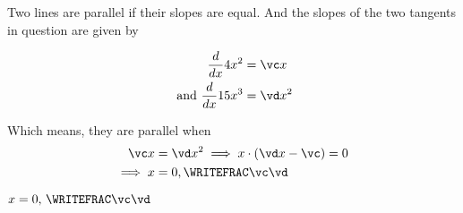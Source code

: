   \begin{solution}[\halfpage]
    Two lines are parallel if their slopes are equal. And the slopes of the 
	two tangents in question are given by
	
	\begin{align}
		\dfrac{d}{dx}\va x^2 &= \vc x \\
		\text{ and } \dfrac{d}{dx}\vb x^3 &= \vd x^2 
	\end{align}
	
	Which means, they are parallel when 
	\begin{align}
		\vc x &= \vd x^2 \implies x\cdot (\vd x - \vc) = 0 \\
		\implies x &= 0, \WRITEFRAC\vc\vd
	\end{align}
\end{solution}

\ifprintanswers
  \begin{codex}
    $x = 0,\,\WRITEFRAC\vc\vd$
  \end{codex}
\fi
